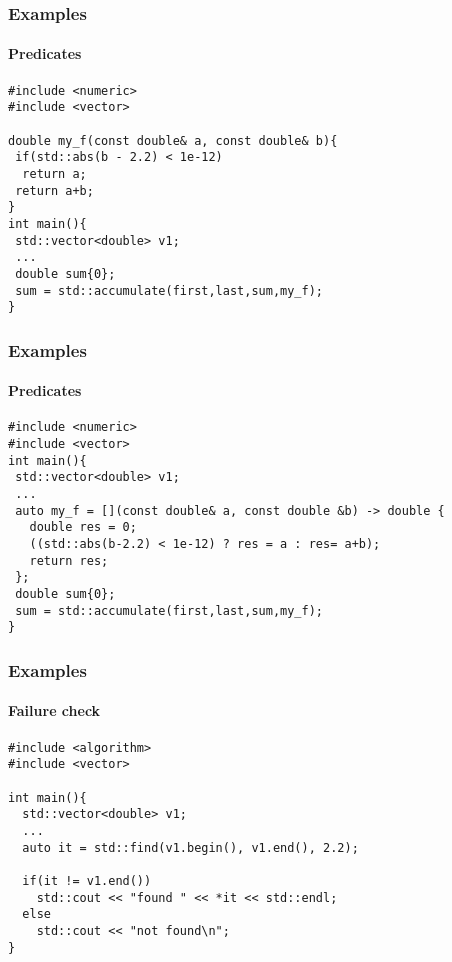 \begin{frame}[fragile]
  \frametitle{Examples}
  \framesubtitle{Predicates}
\begin{lstlisting}
#include <numeric>
#include <vector>

double my_f(const double& a, const double& b){
 if(std::abs(b - 2.2) < 1e-12)
  return a;
 return a+b;
}
int main(){
 std::vector<double> v1;
 ...
 double sum{0};
 sum = std::accumulate(first,last,sum,my_f);
}
\end{lstlisting}

\end{frame}


\begin{frame}[fragile]
  \frametitle{Examples}
  \framesubtitle{Predicates}
\begin{lstlisting}
#include <numeric>
#include <vector>
int main(){
 std::vector<double> v1;
 ...
 auto my_f = [](const double& a, const double &b) -> double {
   double res = 0;
   ((std::abs(b-2.2) < 1e-12) ? res = a : res= a+b);
   return res;
 };
 double sum{0};
 sum = std::accumulate(first,last,sum,my_f);
}
\end{lstlisting}

\end{frame}

\begin{frame}[fragile]
  \frametitle{Examples}
  \framesubtitle{Failure check}
\begin{lstlisting}
#include <algorithm>
#include <vector>
  
int main(){
  std::vector<double> v1;
  ...
  auto it = std::find(v1.begin(), v1.end(), 2.2);

  if(it != v1.end())
    std::cout << "found " << *it << std::endl;
  else
    std::cout << "not found\n";
}
  
\end{lstlisting}
\end{frame}
